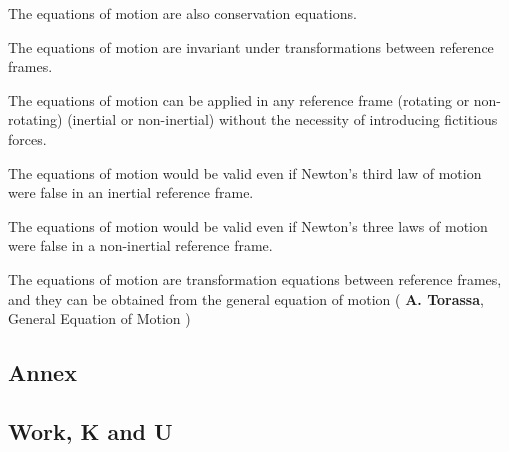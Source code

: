 \documentclass[10pt]{article}
\begin{document}
\par The equations of motion are also conservation equations.
\bigskip
\par The equations of motion are invariant under transformations between reference frames.
\bigskip
\par The equations of motion can be applied in any reference frame (rotating or non-rotating) (inertial or non-inertial) without the necessity of introducing fictitious forces.
\bigskip
\par The equations of motion would be valid even if Newton's third law of motion were false in an inertial reference frame.
\bigskip
\par The equations of motion would be valid even if Newton's three laws of motion were false in a non-inertial reference frame.
\bigskip
\par The equations of motion are transformation equations between reference frames, and they can be obtained from the general equation of motion ( \hspace{-0.45em} \textbf{A. Torassa}, General Equation of Motion \hspace{-0.45em} )

\newpage

{\centering\subsection*{Annex}}

\vspace{+1.20em}

{\centering\subsection*{\rm Work, K and U}}

\vspace{+1.50em}
\end{document}
